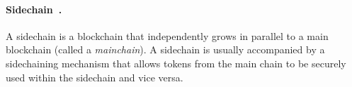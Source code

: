 \documentclass[11pt]{article}
\theoremstyle{mytheoremstyle}
\begin{document}
\paragraph{Sidechain~\cite{sidechains:2014}.} A sidechain is a blockchain that independently grows in parallel to a main blockchain (called a \emph{mainchain}). A sidechain is usually accompanied by a sidechaining mechanism that allows tokens from the main chain to be securely used within the sidechain and vice versa.


\end{document}
